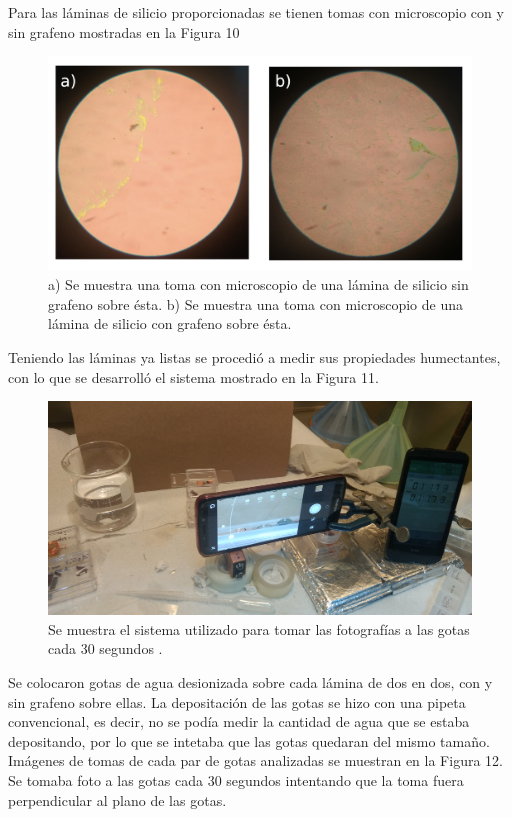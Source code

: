 \documentclass[twocolumn,letterpaper,aps,pra,10pt]{revtex4-1}
\begin{document}
Para las láminas de silicio proporcionadas se tienen tomas con microscopio con y sin grafeno mostradas en la Figura 10

\begin{figure}[h]
\centering
\includegraphics[scale=0.4]{Silicio_sin_con_grafeno.png}
\caption{a) Se muestra una toma con microscopio de una lámina de silicio sin grafeno sobre ésta. b) Se muestra una toma con microscopio de una lámina de silicio con grafeno sobre ésta.}
\end{figure}

Teniendo las láminas ya listas se procedió a medir sus propiedades humectantes, con lo que se desarrolló el sistema mostrado en la Figura 11. 

\begin{figure}[hbtp]
\centering
\includegraphics[scale=0.04]{SistemaGotas.jpg}
\caption{Se muestra el sistema utilizado para tomar las fotografías a las gotas cada 30 segundos .}
\end{figure}

Se colocaron gotas de agua desionizada sobre cada lámina de dos en dos, con y sin grafeno sobre ellas. La depositación de las gotas se hizo con una pipeta convencional, es decir, no se podía medir la cantidad de agua que se estaba depositando, por lo que se intetaba que las gotas quedaran del mismo tamaño. Imágenes de tomas de cada par de gotas analizadas se muestran en la Figura 12. Se tomaba foto a las gotas cada 30 segundos intentando que la toma fuera perpendicular al plano de las gotas.
\end{document}
